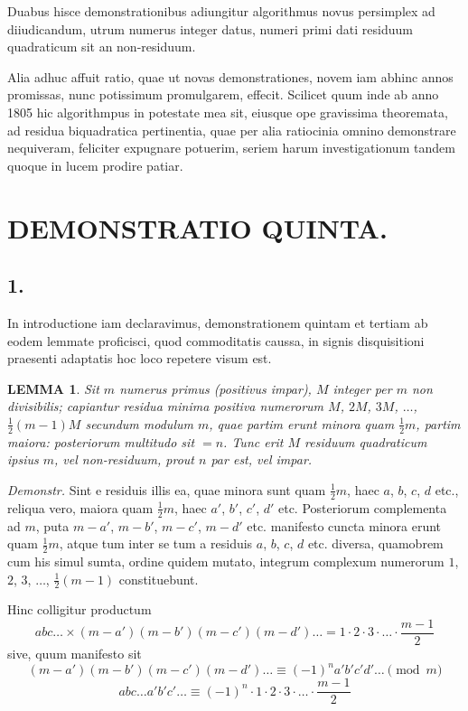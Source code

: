 \documentclass[12pt,a4paper]{article}
\theoremstyle{plain}
\newtheorem*{lemma}{LEMMA}
\theoremstyle{definition}
\theoremstyle{remark}
\begin{document}
Duabus hisce demonstrationibus adiungitur algorithmus novus persimplex ad diiudicandum, utrum numerus integer datus, numeri primi dati residuum quadraticum sit an non-residuum.

Alia adhuc affuit ratio, quae ut novas demonstrationes, novem iam abhinc annos promissas, nunc potissimum promulgarem, effecit. Scilicet quum inde ab anno 1805 hic algorithmpus in potestate mea sit, eiusque ope gravissima theoremata, ad residua biquadratica pertinentia, quae per alia ratiocinia omnino demonstrare nequiveram, feliciter expugnare potuerim, seriem harum investigationum tandem quoque in lucem prodire patiar.

\newpage
\section*{DEMONSTRATIO QUINTA.}

\subsection*{1.}
In introductione iam declaravimus, demonstrationem quintam et tertiam ab eodem lemmate proficisci, quod commoditatis caussa, in signis disquisitioni praesenti adaptatis hoc loco repetere visum est.

\begin{lemma}
Sit $m$ numerus primus (positivus impar), $M$ integer per $m$ non divisibilis; capiantur residua minima positiva numerorum $M$, $2M$, $3M$, $\ldots$, $\frac{1}{2}(m-1)M$ secundum modulum $m$, quae partim erunt minora quam $\frac{1}{2}m$, partim maiora: posteriorum multitudo sit $=n$. Tunc erit $M$ residuum quadraticum ipsius $m$, vel non-residuum, prout $n$ par est, vel impar.
\end{lemma}

\textit{Demonstr.} Sint e residuis illis ea, quae minora sunt quam $\frac{1}{2}m$, haec $a$, $b$, $c$, $d$ etc., reliqua vero, maiora quam $\frac{1}{2}m$, haec $a'$, $b'$, $c'$, $d'$ etc. Posteriorum complementa ad $m$, puta $m-a'$, $m-b'$, $m-c'$, $m-d'$ etc. manifesto cuncta minora erunt quam $\frac{1}{2}m$, atque tum inter se tum a residuis $a$, $b$, $c$, $d$ etc. diversa, quamobrem cum his simul sumta, ordine quidem mutato, integrum complexum numerorum $1$, $2$, $3$, $\ldots$, $\frac{1}{2}(m-1)$ constituebunt.

Hinc colligitur productum
\[abc \ldots \times (m-a')(m-b')(m-c')(m-d') \ldots = 1 \cdot 2 \cdot 3 \cdot \ldots \cdot \frac{m-1}{2}\]
sive, quum manifesto sit
\[(m-a')(m-b')(m-c')(m-d') \ldots \equiv (-1)^n a'b'c'd' \ldots \pmod{m}\]
\[abc \ldots a'b'c' \ldots \equiv (-1)^n \cdot 1 \cdot 2 \cdot 3 \cdot \ldots \cdot \frac{m-1}{2}\]
\end{document}

